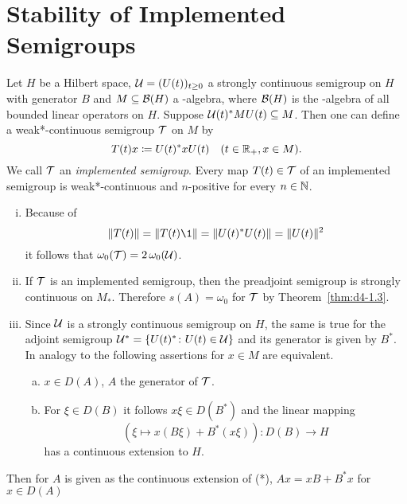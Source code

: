 \section{Stability of Implemented Semigroups}
Let $H$ be a Hilbert space, $\mathcal{U} = (U(t))_{t \geq 0}$ a strongly continuous semigroup on $H$ with generator $B$ and $M \subseteq \mathcal{B}(H)$ a \WA-algebra, where $\mathcal{B}(H)$ is the \WA-algebra of all bounded linear operators on $H$.
Suppose $\mathcal{U}(t)^{*}MU(t) \subseteq M$.
Then one can define a weak*-continuous semigroup $\mathcal{T}$ on $M$ by 
%
\[
	T(t)x \coloneqq U(t)^{*}xU(t) \quad (t \in \mathbb{R}_{+}, x \in M) .
\]
%
We call $\mathcal{T}$ an \emph{implemented semigroup}.
Every map $T(t) \in \mathcal{T}$ of an implemented semigroup is weak*-continuous and $n$-positive for every $n \in \mathbb{N}$.
\begin{remarks}\label{rem:d4-2.1}

\begin{enumerate}[(i), wide]
\item\label{item:d4-2.1-i}
Because of
\[
	\|T(t)\| = \|T(t)\1\| = \|U(t)^{*}U(t)\| = \|U(t)\|^2
\]
it follows that $\omega_{0}(\mathcal{T}) = 2\,\omega_{0}(\mathcal{U})$.

\item\label{item:d4-2.1-ii}
If $\mathcal{T}$ is an implemented semigroup, then the preadjoint semigroup is strongly continuous on $M_{*}$.
Therefore $s(A) = \omega_{0}$ for $\mathcal{T}$ by Theorem~\ref{thm:d4-1.3}.

\item\label{item:d4-2.1-iii}
Since $\mathcal{U}$ is a strongly continuous semigroup on $ H $, the same is true for the adjoint semigroup 
$\mathcal{U}^{*} = \{ U(t)^{*} \colon U(t) \in \mathcal{U} \}$ and its generator is given by $B^{*}$.
In analogy to \citet[3.2.55]{brattelirobinson:1979} the following assertions for $x \in M$ are equivalent.
\begin{enumerate}[(a)]
\item
$x \in D(A)$, $ A $ the generator of $ \mathcal{T} $.

\item
For $\xi \in D(B)$ it follows $x\xi \in D(B^{*})$ and the linear mapping
\begin{equation}
	(\xi \mapsto x(B\xi)+B^{*}(x\xi)): D(B) \to H \tag{*}
\end{equation}
has a continuous extension to $H$.
\end{enumerate}
\end{enumerate}
\end{remarks}
Then for $A$ is given as the continuous extension of (*), \ie 
 $Ax = xB + B^{*}x$ for $ x \in D(A) $

